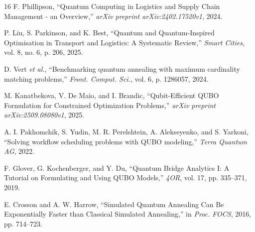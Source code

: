 \documentclass[conference]{IEEEtran}
\begin{document}
\begin{thebibliography}{16}
F. Phillipson, ``Quantum Computing in Logistics and Supply Chain Management - an Overview,'' \textit{arXiv preprint arXiv:2402.17520v1}, 2024.

P. Liu, S. Parkinson, and K. Best, ``Quantum and Quantum-Inspired Optimisation in Transport and Logistics: A Systematic Review,'' \textit{Smart Cities}, vol. 8, no. 6, p. 206, 2025.

D. Vert \textit{et al.}, ``Benchmarking quantum annealing with maximum cardinality matching problems,'' \textit{Front. Comput. Sci.}, vol. 6, p. 1286057, 2024.

M. Kanatbekova, V. De Maio, and I. Brandic, ``Qubit-Efficient QUBO Formulation for Constrained Optimization Problems,'' \textit{arXiv preprint arXiv:2509.08080v1}, 2025.

A. I. Pakhomchik, S. Yudin, M. R. Perelshtein, A. Alekseyenko, and S. Yarkoni, ``Solving workflow scheduling problems with QUBO modeling,'' \textit{Terra Quantum AG}, 2022.

F. Glover, G. Kochenberger, and Y. Du, ``Quantum Bridge Analytics I: A Tutorial on Formulating and Using QUBO Models,'' \textit{4OR}, vol. 17, pp. 335--371, 2019.

E. Crosson and A. W. Harrow, ``Simulated Quantum Annealing Can Be Exponentially Faster than Classical Simulated Annealing,'' in \textit{Proc. FOCS}, 2016, pp. 714--723.

\end{thebibliography}
\end{document}
